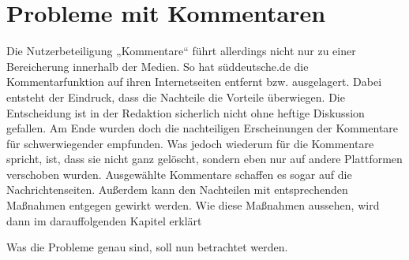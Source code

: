 \chapter{Probleme mit Kommentaren}

Die Nutzerbeteiligung „Kommentare“ führt allerdings nicht nur zu einer
Bereicherung innerhalb der Medien. So hat süddeutsche.de die Kommentarfunktion
auf ihren Internetseiten entfernt bzw. ausgelagert. Dabei entsteht der Eindruck,
dass die Nachteile die Vorteile überwiegen. Die Entscheidung ist in der
Redaktion sicherlich nicht ohne heftige Diskussion gefallen. Am Ende wurden doch
die nachteiligen Erscheinungen der Kommentare für schwerwiegender empfunden. Was
jedoch wiederum für die Kommentare spricht, ist, dass sie nicht ganz gelöscht,
sondern eben nur auf andere Plattformen verschoben wurden. Ausgewählte
Kommentare schaffen es sogar auf die Nachrichtenseiten. Außerdem kann den
Nachteilen mit entsprechenden Maßnahmen entgegen gewirkt werden. Wie diese
Maßnahmen aussehen, wird dann im darauffolgenden Kapitel erklärt

Was die Probleme genau sind, soll nun betrachtet werden.


